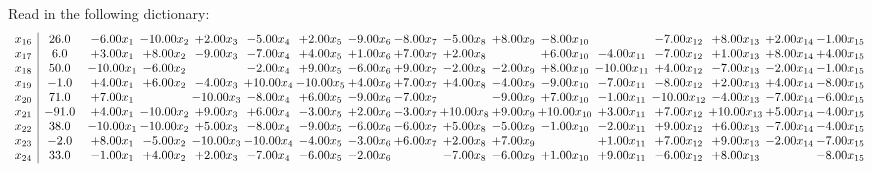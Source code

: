 \documentclass[9pt]{article}
\begin{document}
Read in the following dictionary:
\[\begin{array}{c| c c@{\hskip 2pt} c@{\hskip 2pt} c@{\hskip 2pt} c@{\hskip 2pt} c@{\hskip 2pt} c@{\hskip 2pt} c@{\hskip 2pt} c@{\hskip 2pt} c@{\hskip 2pt} c@{\hskip 2pt} c@{\hskip 2pt} c@{\hskip 2pt} c@{\hskip 2pt} c@{\hskip 2pt} c@{\hskip 2pt} }
 x_{16}   &  26.0 & -6.00 x_{1} & -10.00 x_{2} & +  2.00 x_{3} & -5.00 x_{4} & +  2.00 x_{5} & -9.00 x_{6} & -8.00 x_{7} & -5.00 x_{8} & +  8.00 x_{9} & -8.00 x_{10} &   & -7.00 x_{12} & +  8.00 x_{13} & +  2.00 x_{14} & -1.00 x_{15}\\
 x_{17}   &  6.0 & +  3.00 x_{1} & +  8.00 x_{2} & -9.00 x_{3} & -7.00 x_{4} & +  4.00 x_{5} & +  1.00 x_{6} & +  7.00 x_{7} & +  2.00 x_{8} &   & +  6.00 x_{10} & -4.00 x_{11} & -7.00 x_{12} & +  1.00 x_{13} & +  8.00 x_{14} & +  4.00 x_{15}\\
 x_{18}   &  50.0 & -10.00 x_{1} & -6.00 x_{2} &   & -2.00 x_{4} & +  9.00 x_{5} & -6.00 x_{6} & +  9.00 x_{7} & -2.00 x_{8} & -2.00 x_{9} & +  8.00 x_{10} & -10.00 x_{11} & +  4.00 x_{12} & -7.00 x_{13} & -2.00 x_{14} & -1.00 x_{15}\\
 x_{19}   &  -1.0 & +  4.00 x_{1} & +  6.00 x_{2} & -4.00 x_{3} & + 10.00 x_{4} & -10.00 x_{5} & +  4.00 x_{6} & +  7.00 x_{7} & +  4.00 x_{8} & -4.00 x_{9} & -9.00 x_{10} & -7.00 x_{11} & -8.00 x_{12} & +  2.00 x_{13} & +  4.00 x_{14} & -8.00 x_{15}\\
 x_{20}   &  71.0 & +  7.00 x_{1} &   & -10.00 x_{3} & -8.00 x_{4} & +  6.00 x_{5} & -9.00 x_{6} & -7.00 x_{7} &   & -9.00 x_{9} & +  7.00 x_{10} & -1.00 x_{11} & -10.00 x_{12} & -4.00 x_{13} & -7.00 x_{14} & -6.00 x_{15}\\
 x_{21}   &  -91.0 & +  4.00 x_{1} & -10.00 x_{2} & +  9.00 x_{3} & +  6.00 x_{4} & -3.00 x_{5} & +  2.00 x_{6} & -3.00 x_{7} & + 10.00 x_{8} & +  9.00 x_{9} & + 10.00 x_{10} & +  3.00 x_{11} & +  7.00 x_{12} & + 10.00 x_{13} & +  5.00 x_{14} & -4.00 x_{15}\\
 x_{22}   &  38.0 & -10.00 x_{1} & -10.00 x_{2} & +  5.00 x_{3} & -8.00 x_{4} & -9.00 x_{5} & -6.00 x_{6} & -6.00 x_{7} & +  5.00 x_{8} & -5.00 x_{9} & -1.00 x_{10} & -2.00 x_{11} & +  9.00 x_{12} & +  6.00 x_{13} & -7.00 x_{14} & -4.00 x_{15}\\
 x_{23}   &  -2.0 & +  8.00 x_{1} & -5.00 x_{2} & -10.00 x_{3} & -10.00 x_{4} & -4.00 x_{5} & -3.00 x_{6} & +  6.00 x_{7} & +  2.00 x_{8} & +  7.00 x_{9} &   & +  1.00 x_{11} & +  7.00 x_{12} & +  9.00 x_{13} & -2.00 x_{14} & -7.00 x_{15}\\
 x_{24}   &  33.0 & -1.00 x_{1} & +  4.00 x_{2} & +  2.00 x_{3} & -7.00 x_{4} & -6.00 x_{5} & -2.00 x_{6} &   & -7.00 x_{8} & -6.00 x_{9} & +  1.00 x_{10} & +  9.00 x_{11} & -6.00 x_{12} & +  8.00 x_{13} &   & -8.00 x_{15}\\

\end{array}\]
\end{document}
